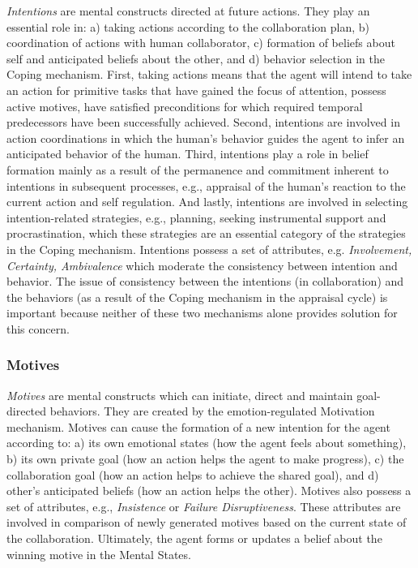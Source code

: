 \textit{Intentions} are mental constructs directed at future actions. They play
an essential role in: a) taking actions according to the collaboration plan, b)
coordination of actions with human collaborator, c) formation of beliefs about
self and anticipated beliefs about the other, and d) behavior selection in the
Coping mechanism. First, taking actions means that the agent will intend to take
an action for primitive tasks that have gained the focus of attention, possess
active motives, have satisfied preconditions for which required temporal
predecessors have been successfully achieved. Second, intentions are involved
in action coordinations in which the human's behavior guides the agent to infer
an anticipated behavior of the human. Third, intentions play a role in belief
formation mainly as a result of the permanence and commitment inherent to
intentions in subsequent processes, e.g., appraisal of the human's reaction to
the current action and self regulation. And lastly, intentions are involved in
selecting intention-related strategies, e.g., planning, seeking instrumental
support and procrastination, which these strategies are an essential category of
the strategies in the Coping mechanism. Intentions possess a set of attributes,
e.g. \textit{Involvement, Certainty, Ambivalence} which moderate the consistency
between intention and behavior. The issue of consistency between the intentions
(in collaboration) and the behaviors (as a result of the Coping mechanism in the
appraisal cycle) is important because neither of these two mechanisms alone
provides solution for this concern.

\subsubsection{Motives}
\label{sec:motives}

\textit{Motives} are mental constructs which can initiate, direct and maintain
goal-directed behaviors. They are created by the emotion-regulated Motivation
mechanism. Motives can cause the formation of a new intention for the agent
according to: a) its own emotional states (how the agent feels about something),
b) its own private goal (how an action helps the agent to make progress), c) the
collaboration goal (how an action helps to achieve the shared goal), and d)
other's anticipated beliefs (how an action helps the other). Motives also
possess a set of attributes, e.g., \textit{Insistence} or \textit{Failure
Disruptiveness}. These attributes are involved in comparison of newly generated
motives based on the current state of the collaboration. Ultimately, the agent
forms or updates a belief about the winning motive in the Mental States.

